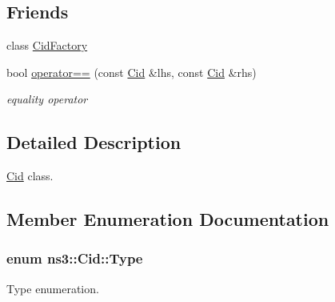 \subsection*{Friends}
\begin{DoxyCompactItemize}
\item 
class \hyperlink{classns3_1_1Cid_a4981f7f5929dcd196259202f7eeef295}{Cid\+Factory}
\item 
bool \hyperlink{classns3_1_1Cid_acb19a1026d2d644377516fbb4b774859}{operator==} (const \hyperlink{classns3_1_1Cid}{Cid} \&lhs, const \hyperlink{classns3_1_1Cid}{Cid} \&rhs)
\begin{DoxyCompactList}\small\item\em equality operator \end{DoxyCompactList}\end{DoxyCompactItemize}


\subsection{Detailed Description}
\hyperlink{classns3_1_1Cid}{Cid} class. 

\subsection{Member Enumeration Documentation}
\subsubsection[{\texorpdfstring{Type}{Type}}]{\setlength{\rightskip}{0pt plus 5cm}enum {\bf ns3\+::\+Cid\+::\+Type}}\hypertarget{classns3_1_1Cid_a10b8f92080ca5790e65a0bfa2f557e0a}{}\label{classns3_1_1Cid_a10b8f92080ca5790e65a0bfa2f557e0a}


Type enumeration. 

